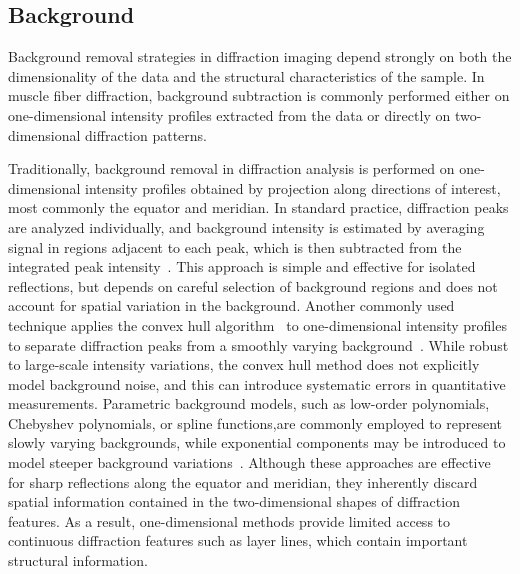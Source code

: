 \documentclass[iucr]{iucrjournals}
\begin{document}
\subsection{Background}

Background removal strategies in diffraction imaging depend strongly on both the dimensionality of the data and the structural characteristics of the sample. In muscle fiber diffraction, background subtraction is commonly performed either on one-dimensional intensity profiles extracted from the data or directly on two-dimensional diffraction patterns.

Traditionally, background removal in diffraction analysis is performed on one-dimensional intensity profiles obtained by projection along directions of interest, most commonly the equator and meridian. In standard practice, diffraction peaks are analyzed individually, and background intensity is estimated by averaging signal in regions adjacent to each peak, which is then subtracted from the integrated peak intensity~\cite{NederKorsunskiy2018}. This approach is simple and effective for isolated reflections, but depends on careful selection of background regions and does not account for spatial variation in the background. Another commonly used technique applies the convex hull algorithm~\cite{jarvis1973convex_hull} to one-dimensional intensity profiles to separate diffraction peaks from a smoothly varying background~\cite{lee2019musclex}. While robust to large-scale intensity variations, the convex hull method does not explicitly model background noise, and this can introduce systematic errors in quantitative measurements. Parametric background models, such as low-order polynomials, Chebyshev polynomials, or spline functions,are commonly employed to represent slowly varying backgrounds, while exponential components may be introduced to model steeper background variations~\cite{rajkumar2007fibrefix}. Although these approaches are effective for sharp reflections along the equator and meridian, they inherently discard spatial information contained in the two-dimensional shapes of diffraction features. As a result, one-dimensional methods provide limited access to continuous diffraction features such as layer lines, which contain important structural information.
\end{document}
